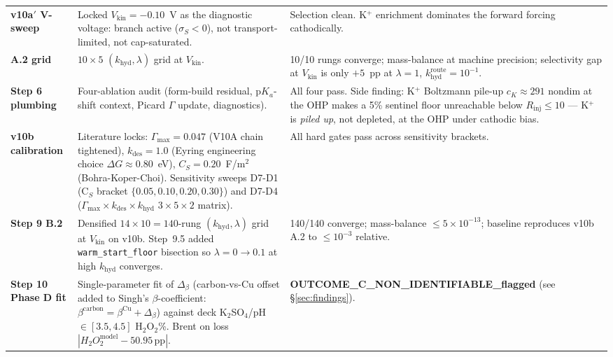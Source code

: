 \documentclass[11pt]{article}
\begin{document}
\begin{center}
\begin{longtable}{@{}p{1.7cm}p{6.8cm}p{6.0cm}@{}}
\textbf{v10a$'$ V-sweep} &
  Locked $V_{\mathrm{kin}}=-0.10$~V as the diagnostic voltage: branch
  active ($\sigma_S{<}0$), not transport-limited, not cap-saturated. &
  Selection clean.  K$^+$ enrichment dominates the forward forcing
  cathodically. \\
\addlinespace

\textbf{A.2 grid} &
  $10\times 5$ $(k_{\mathrm{hyd}},\lambda)$ grid at $V_{\mathrm{kin}}$. &
  10/10 rungs converge; mass-balance at machine precision; selectivity
  gap at $V_{\mathrm{kin}}$ is only $+5$~pp at $\lambda{=}1$,
  $k_{\mathrm{hyd}}^{\mathrm{route}}=10^{-1}$. \\
\addlinespace

\textbf{Step 6 plumbing} &
  Four-ablation audit (form-build residual, p$K_a$-shift context,
  Picard $\Gamma$ update, diagnostics). &
  All four pass.  Side finding: K$^+$ Boltzmann pile-up
  $c_K\approx 291$ nondim at the OHP makes a 5\% sentinel floor
  unreachable below $R_{\mathrm{inj}}\leq 10$ ---  K$^+$ is
  \emph{piled up}, not depleted, at the OHP under cathodic bias. \\
\addlinespace

\textbf{v10b calibration} &
  Literature locks: $\Gamma_{\max}{=}0.047$ (V10A chain tightened),
  $k_{\mathrm{des}}{=}1.0$ (Eyring engineering choice $\Delta G\approx
  0.80$~eV), $C_S{=}0.20$~F/m$^2$ (Bohra-Koper-Choi).
  Sensitivity sweeps D7-D1 (C$_S$ bracket $\{0.05, 0.10, 0.20, 0.30\}$)
  and D7-D4 ($\Gamma_{\max}\times k_{\mathrm{des}}\times k_{\mathrm{hyd}}$
  $3\times 5\times 2$ matrix). &
  All hard gates pass across sensitivity brackets. \\
\addlinespace

\textbf{Step 9 B.2} &
  Densified $14\times 10 = 140$-rung $(k_{\mathrm{hyd}},\lambda)$
  grid at $V_{\mathrm{kin}}$ on v10b. Step~9.5 added
  \texttt{warm\_start\_floor} bisection so $\lambda=0\to 0.1$ at
  high $k_{\mathrm{hyd}}$ converges. &
  140/140 converge; mass-balance $\leq 5\times 10^{-13}$; baseline
  reproduces v10b A.2 to $\leq 10^{-3}$ relative. \\
\addlinespace

\textbf{Step 10 Phase D fit} &
  Single-parameter fit of $\Delta_\beta$ (carbon-vs-Cu offset added
  to Singh's $\beta$-coefficient: $\beta^{\mathrm{carbon}}=\beta^{\mathrm{Cu}}+\Delta_\beta$)
  against deck K$_2$SO$_4$/pH$\in[3.5,4.5]$ H$_2$O$_2$\%.  Brent on
  loss $|H_2O_2^{\mathrm{model}}-50.95\,\mathrm{pp}|$. &
  \textcolor{themeRed}{\textbf{OUTCOME\_C\_NON\_IDENTIFIABLE\_flagged}}
  (see §\ref{sec:findings}). \\

\bottomrule
\end{longtable}
\end{center}
\end{document}
